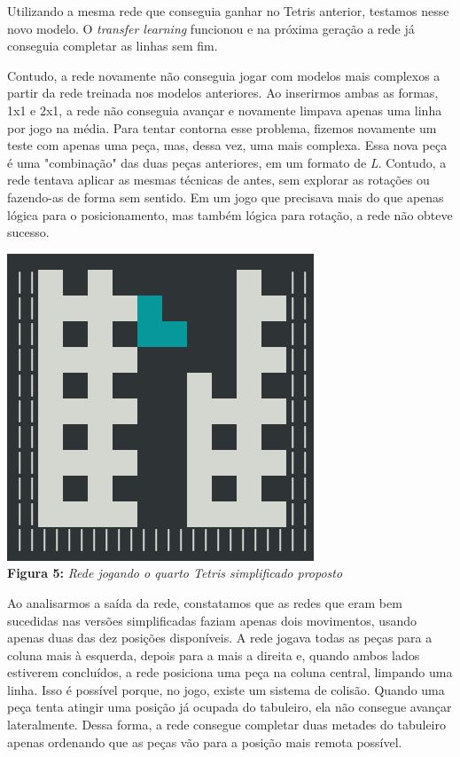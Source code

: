 \documentclass[conference]{IEEEtran}
\begin{document}
Utilizando a mesma rede que conseguia ganhar no Tetris anterior, testamos nesse novo modelo. O \textit{transfer learning} funcionou e na próxima geração a rede já conseguia completar as linhas sem fim.

Contudo, a rede novamente não conseguia jogar com modelos mais complexos a partir da rede treinada nos modelos anteriores. Ao inserirmos ambas as formas, 1x1 e 2x1, a rede não conseguia avançar e novamente limpava apenas uma linha por jogo na média. Para tentar contorna esse problema, fizemos novamente um teste com apenas uma peça, mas, dessa vez, uma mais complexa. Essa nova peça é uma "combinação" das duas peças anteriores, em um formato de \textit{L}. Contudo, a rede tentava aplicar as mesmas técnicas de antes, sem explorar as rotações ou fazendo-as de forma sem sentido. Em um jogo que precisava mais do que apenas lógica para o posicionamento, mas também lógica para rotação, a rede não obteve sucesso.

\begin{center}
\includegraphics[scale=0.3]{tetris_lose2.png}\\

\textbf{Figura 5:} \textit{Rede jogando o quarto Tetris simplificado proposto}
\end{center}

Ao analisarmos a saída da rede, constatamos que as redes que eram bem sucedidas nas versões simplificadas faziam apenas dois movimentos, usando apenas duas das dez posições disponíveis. A rede jogava todas as peças para a coluna mais à esquerda, depois para a mais a direita e, quando ambos lados estiverem concluídos, a rede posiciona uma peça na coluna central, limpando uma linha. Isso é possível porque, no jogo, existe um sistema de colisão. Quando uma peça tenta atingir uma posição já ocupada do tabuleiro, ela não consegue avançar lateralmente. Dessa forma, a rede consegue completar duas metades do tabuleiro apenas ordenando que as peças vão para a posição mais remota possível.
\end{document}
